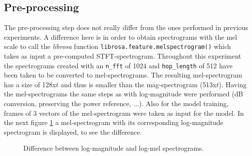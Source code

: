 \subsection{Pre-processing}
The pre-processing step does not really differ from the ones performed in previous experiments. A difference here is in order to obtain spectrograms with the mel scale to call the \textit{librosa} function \texttt{librosa.feature.melspectrogram()} which takes as input a pre-computed STFT-spectrogram. Throughout this experiment the spectrograms created with an \texttt{n\_fft} of 1024 and \texttt{hop\_length} of 512 have been taken to be converted to mel-spectrograms. The resulting mel-spectrogram has a size of 128x$t$ and thus is smaller than the mag-spectrogram (513x$t$). Having the mel-spectrograms the same steps as with log-magnitude were performed (dB conversion, preserving the power reference, ...). Also for the model training, frames of 3 vectors of the mel-spectrogram were taken as input for the model. In the next figure \ref{fig:exp_mag_mel} a mel-spectrogram with its corresponding log-magnitude spectrogram is displayed, to see the difference.

\begin{figure}[htb!]
    \centering
    \caption{Difference between log-magnitude and log-mel spectrograms.}
    \label{fig:exp_mag_mel}
\end{figure}

